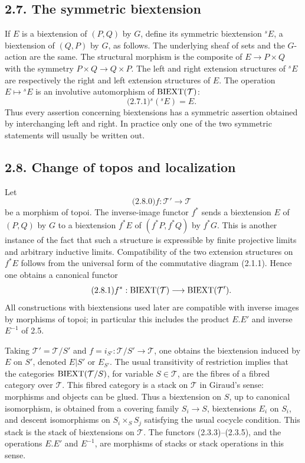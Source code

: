 \documentclass[11pt]{article}
\begin{document}
\subsection*{2.7. The symmetric biextension}
If \(E\) is a biextension of \((P,Q)\) by \(G\), define its symmetric biextension \({}^sE\), a biextension of \((Q,P)\) by \(G\), as follows.  The underlying sheaf of sets and the \(G\)-action are the same.  The structural morphism is the composite of \(E\to P\times Q\) with the symmetry \(P\times Q\to Q\times P\).  The left and right extension structures of \({}^sE\) are respectively the right and left extension structures of \(E\).  The operation \(E\mapsto{}^sE\) is an involutive automorphism of \(\operatorname{BIEXT}(\mathcal T)\):
\begin{equation}\qquad\text{(2.7.1)}
  {}^s({}^sE)=E.
\end{equation}
Thus every assertion concerning biextensions has a symmetric assertion obtained by interchanging left and right.  In practice only one of the two symmetric statements will usually be written out.

\subsection*{2.8. Change of topos and localization}
Let
\begin{equation}\qquad\text{(2.8.0)}
  f:\mathcal T'\longrightarrow\mathcal T
\end{equation}
be a morphism of topoi.  The inverse-image functor \(f^*\) sends a biextension \(E\) of \((P,Q)\) by \(G\) to a biextension \(f^*E\) of \((f^*P,f^*Q)\) by \(f^*G\).  This is another instance of the fact that such a structure is expressible by finite projective limits and arbitrary inductive limits.  Compatibility of the two extension structures on \(f^*E\) follows from the universal form of the commutative diagram (2.1.1).  Hence one obtains a canonical functor
\begin{equation}\qquad\text{(2.8.1)}
  f^*:\operatorname{BIEXT}(\mathcal T)\longrightarrow\operatorname{BIEXT}(\mathcal T').
\end{equation}
All constructions with biextensions used later are compatible with inverse images by morphisms of topoi; in particular this includes the product \(E.E'\) and inverse \(E^{-1}\) of 2.5.

Taking \(\mathcal T'=\mathcal T/S'\) and \(f=i_{S'}:\mathcal T/S'\to\mathcal T\), one obtains the biextension induced by \(E\) on \(S'\), denoted \(E|S'\) or \(E_{S'}\).  The usual transitivity of restriction implies that the categories \(\operatorname{BIEXT}(\mathcal T/S)\), for variable \(S\in\mathcal T\), are the fibres of a fibred category over \(\mathcal T\).  This fibred category is a stack on \(\mathcal T\) in Giraud's sense: morphisms and objects can be glued.  Thus a biextension on \(S\), up to canonical isomorphism, is obtained from a covering family \(S_i\to S\), biextensions \(E_i\) on \(S_i\), and descent isomorphisms on \(S_i\times_SS_j\) satisfying the usual cocycle condition.  This stack is the stack of biextensions on \(\mathcal T\).  The functors (2.3.3)--(2.3.5), and the operations \(E.E'\) and \(E^{-1}\), are morphisms of stacks or stack operations in this sense.
\end{document}
